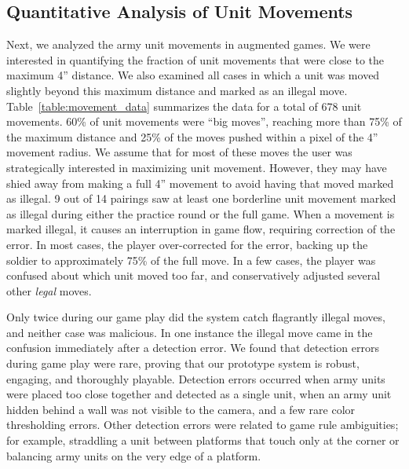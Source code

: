 \vspace{-0.15in}
\subsection{Quantitative Analysis of Unit Movements}



Next, we analyzed the army unit movements in augmented games.  We
were interested in quantifying the fraction of unit movements that
were close to the maximum 4'' distance.  We also examined
all cases in which a unit was moved slightly beyond this maximum distance
and marked as an illegal move.  Table~\ref{table:movement_data}
summarizes the data for a total of 678 unit movements.
%
60\% of unit movements were ``big moves'', reaching more than 75\% of
the maximum distance and 25\% of the moves pushed within a pixel of
the 4'' movement radius.  We assume that for most of these moves the
user was strategically interested in maximizing unit movement.
However, they may have shied away from making a full 4'' movement to
avoid having that moved marked as illegal.  9 out of 14 pairings saw
at least one borderline unit movement marked as illegal during either
the practice round or the full game.  When a movement
is marked illegal,
it causes an interruption in game flow, requiring correction of the
error.  In most cases, the player over-corrected for the error,
backing up the soldier to approximately 75\% of the full move.  In a
few cases, the player was confused about which unit moved too far, and
conservatively adjusted several other {\em legal} moves.

Only twice during our game play did the system catch flagrantly
illegal moves, and neither case was malicious.  In one instance the
illegal move came in the confusion immediately after a detection
error.  We found that detection errors during game play were rare,
proving that our prototype system is robust, engaging, and thoroughly
playable.  Detection errors occurred when army units were placed too
close together and detected as a single unit,
when an army unit hidden behind a wall was not visible to the camera,
and a few rare color thresholding errors.
Other detection errors were related to game rule ambiguities; for
example, straddling a unit between platforms that touch only at the
corner or balancing army units on the very edge of a platform.



